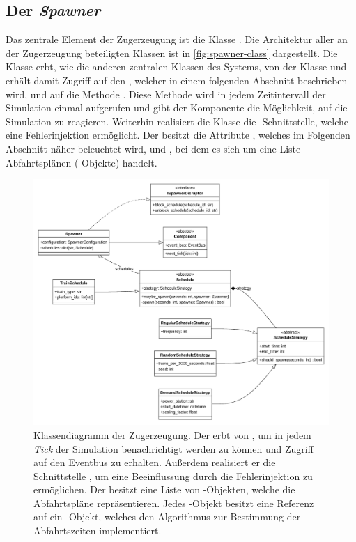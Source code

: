 \subsection{Der \emph{Spawner}}

Das zentrale Element der Zugerzeugung ist die Klasse . Die Architektur aller an der Zugerzeugung beteiligten Klassen ist in \autoref{fig:spawner-class} dargestellt. Die Klasse  erbt, wie die anderen zentralen Klassen des Systems, von der Klasse  und erhält damit Zugriff auf den , welcher in einem folgenden Abschnitt beschrieben wird, und auf die Methode . Diese Methode wird in jedem Zeitintervall der Simulation einmal aufgerufen und gibt der Komponente die Möglichkeit, auf die Simulation zu reagieren. Weiterhin realisiert die Klasse  die -Schnittstelle, welche eine Fehlerinjektion \cite{persitzky_fehlerinjektion_2023} ermöglicht. Der  besitzt die Attribute , welches im Folgenden Abschnitt näher beleuchtet wird, und , bei dem es sich um eine Liste Abfahrtsplänen (-Objekte) handelt.

\begin{figure}[!ht]
	\centering
	\includegraphics[width=1.0\linewidth]{images/diagrams/spawner-class.pdf}
	\caption{Klassendiagramm der Zugerzeugung. Der  erbt von , um in jedem \emph{Tick} der Simulation benachrichtigt werden zu können und Zugriff auf den Eventbus zu erhalten. Außerdem realisiert er die Schnittstelle , um eine Beeinflussung durch die Fehlerinjektion zu ermöglichen. Der  besitzt eine Liste von -Objekten, welche die Abfahrtspläne repräsentieren. Jedes -Objekt besitzt eine Referenz auf ein -Objekt, welches den Algorithmus zur Bestimmung der Abfahrtszeiten implementiert.}
	\label{fig:spawner-class}
\end{figure}

